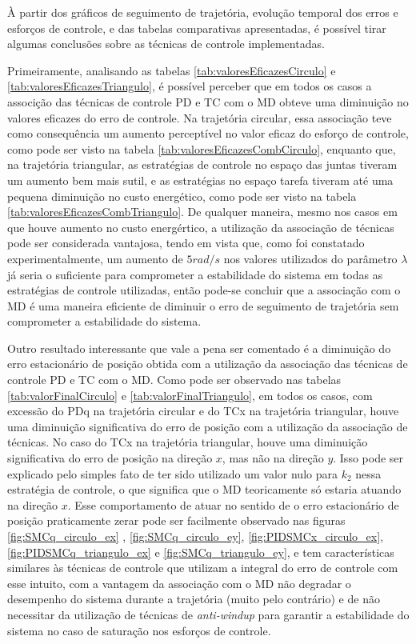 \documentclass[]{politex}
\begin{document}
À partir dos gráficos de seguimento de trajetória, evolução temporal dos erros e esforços de controle, e das tabelas comparativas apresentadas, é possível tirar algumas conclusões sobre as técnicas de controle implementadas.

Primeiramente, analisando as tabelas \ref{tab:valoresEficazesCirculo} e \ref{tab:valoresEficazesTriangulo}, é possível perceber que em todos os casos a associção das técnicas de controle PD e TC com o MD obteve uma diminuição no valores eficazes do erro de controle. Na trajetória circular, essa associação teve como consequência um aumento perceptível no valor eficaz do esforço de controle, como pode ser visto na tabela \ref{tab:valoresEficazesCombCirculo}, enquanto que, na trajetória triangular, as estratégias de controle no espaço das juntas tiveram um aumento bem mais sutil, e as estratégias no espaço tarefa tiveram até uma pequena diminuição no custo energético, como pode ser visto na tabela \ref{tab:valoresEficazesCombTriangulo}. De qualquer maneira, mesmo nos casos em que houve aumento no custo energértico, a utilização da associação de técnicas pode ser considerada vantajosa, tendo em vista que, como foi constatado experimentalmente, um aumento de $5rad/s$ nos valores utilizados do parâmetro $\lambda$  já seria o suficiente para comprometer a estabilidade do sistema em todas as estratégias de controle utilizadas, então pode-se concluir que a associação com o MD é uma maneira eficiente de diminuir o erro de seguimento de trajetória sem comprometer a estabilidade do sistema.  

Outro resultado interessante que vale a pena ser comentado é a diminuição do erro estacionário de posição obtida com a utilização da associação das técnicas de controle PD e TC com o MD. Como pode ser observado nas tabelas \ref{tab:valorFinalCirculo} e \ref{tab:valorFinalTriangulo}, em todos os casos, com excessão do PDq na trajetória circular e do TCx na trajetória triangular, houve uma diminuição significativa do erro de posição com a utilização da associação de técnicas. No caso do TCx na trajetória triangular, houve uma diminuição significativa do erro de posição na direção $x$, mas não na direção $y$. Isso pode ser explicado pelo simples fato de ter sido utilizado um valor nulo para $k_2$ nessa estratégia de controle, o que significa que o MD teoricamente só estaria atuando na direção $x$. Esse comportamento de atuar no sentido de o erro estacionário de posição praticamente zerar pode ser facilmente observado nas figuras \ref{fig:SMCq_circulo_ex} , \ref{fig:SMCq_circulo_ey}, \ref{fig:PIDSMCx_circulo_ex}, \ref{fig:PIDSMCq_triangulo_ex} e \ref{fig:SMCq_triangulo_ey}, e tem características similares às técnicas de controle que utilizam a integral do erro de controle com esse intuito, com a vantagem da associação com o MD não degradar o desempenho do sistema durante a trajetória (muito pelo contrário) e de não necessitar da utilização de técnicas de \emph{anti-windup} para garantir a estabilidade do sistema no caso de saturação nos esforços de controle.
\end{document}

